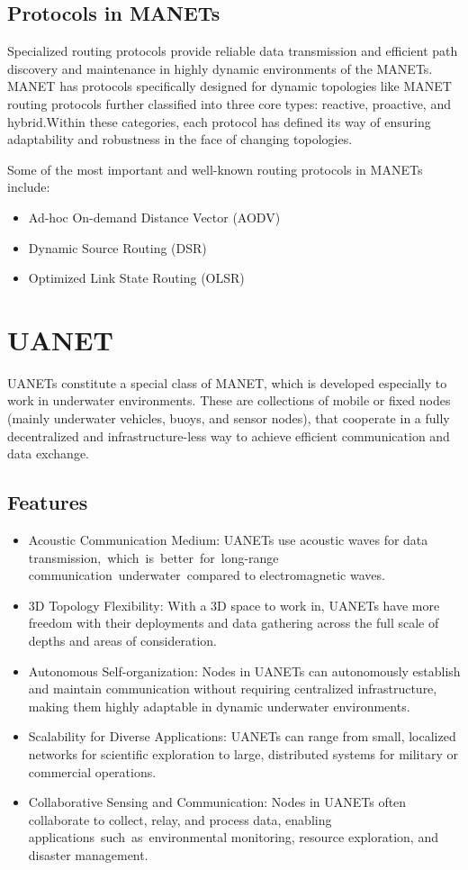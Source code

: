 \documentclass[]{nsm-thesis}
\begin{document}
\subsection{Protocols in MANETs}
Specialized routing protocols provide reliable data transmission and efficient path discovery and maintenance in highly dynamic environments of the MANETs. MANET has protocols specifically designed for dynamic topologies like MANET routing protocols further classified into three core types: reactive, proactive, and hybrid.Within these categories, each protocol has defined its way of ensuring adaptability and robustness in the face of changing topologies.

Some of the most important and well-known routing protocols in MANETs include:

\begin{itemize}
    \item Ad-hoc On-demand Distance Vector (AODV) \cite{rfc3561}
    \item Dynamic Source Routing (DSR) \cite{rfc4728}
    \item Optimized Link State Routing (OLSR) \cite{rfc3626}
\end{itemize}




\section{UANET}
UANETs \cite{8976642} constitute a special class of MANET, which is developed especially to work in underwater environments. These are collections of mobile or fixed nodes (mainly underwater vehicles, buoys, and sensor nodes), that cooperate in a fully decentralized and infrastructure-less way to achieve efficient communication and data exchange.
\subsection{Features}
\begin{itemize}
    \item Acoustic Communication Medium: UANETs use acoustic waves for data transmission, which is better for long-range communication underwater compared to electromagnetic waves.
    \item 3D Topology Flexibility: With a 3D space to work in, UANETs have more freedom with their deployments and data gathering across the full scale of depths and areas of consideration.
    \item Autonomous Self-organization: Nodes in UANETs can autonomously establish and maintain communication without requiring centralized infrastructure, making them highly adaptable in dynamic underwater environments.
    \item Scalability for Diverse Applications: UANETs can range from small, localized networks for scientific exploration to large, distributed systems for military or commercial operations.
    \item Collaborative Sensing and Communication: Nodes in UANETs often collaborate to collect, relay, and process data, enabling applications such as environmental monitoring, resource exploration, and disaster management.
\end{itemize}
\end{document}
